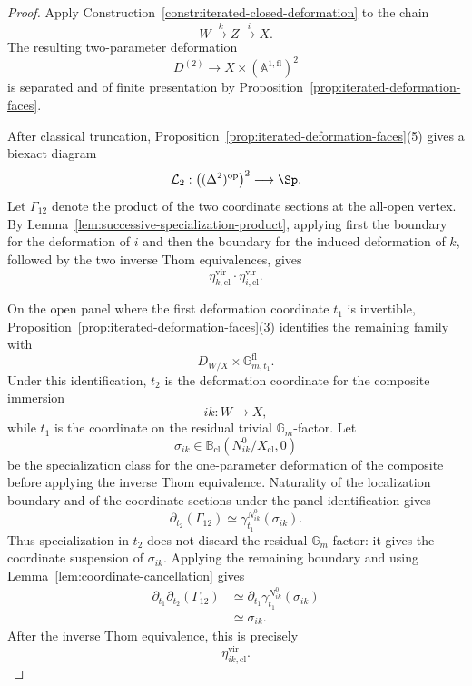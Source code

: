 \begin{proof}
Apply
Construction~\ref{constr:iterated-closed-deformation}
to the chain
\[
    W\xrightarrow{k}Z\xrightarrow{i}X.
\]
The resulting two-parameter deformation
\[
    D^{(2)}
    \longrightarrow
    X\times
    (\mathbb A^{1,\mathrm{fl}})^2
\]
is separated and of finite presentation by
Proposition~\ref{prop:iterated-deformation-faces}.

After classical truncation,
Proposition~\ref{prop:iterated-deformation-faces}(5)
gives a biexact diagram
\[
    \mathcal L_2:
    \bigl(
      (\Delta^2)^{\mathrm{op}}
    \bigr)^2
    \longrightarrow
    \Sp.
\]
Let \(\Gamma_{12}\) denote the product of the two coordinate sections at
the all-open vertex.  By
Lemma~\ref{lem:successive-specialization-product}, applying first the
boundary for the deformation of \(i\) and then the boundary for the induced
deformation of \(k\), followed by the two inverse Thom equivalences, gives
\[
    \eta^{\mathrm{vir}}_{k,\mathrm{cl}}
    \cdot
    \eta^{\mathrm{vir}}_{i,\mathrm{cl}}.
\]

On the open panel where the first deformation coordinate \(t_1\) is
invertible,
Proposition~\ref{prop:iterated-deformation-faces}(3)
identifies the remaining family with
\[
    D_{W/X}\times\mathbb G_{m,t_1}^{\mathrm{fl}}.
\]
Under this identification, \(t_2\) is the deformation coordinate for the
composite immersion
\[
    ik:W\longrightarrow X,
\]
while \(t_1\) is the coordinate on the residual trivial
\(\mathbb G_m\)-factor.  Let
\[
    \sigma_{ik}
    \in
    \mathbb B_{\mathrm{cl}}
    (N_{ik}^0/X_{\mathrm{cl}},0)
\]
be the specialization class for the one-parameter deformation of the
composite before applying the inverse Thom equivalence.  Naturality of the
localization boundary and of the coordinate sections under the panel
identification gives
\[
    \partial_{t_2}(\Gamma_{12})
    \simeq
    \gamma_{t_1}^{N_{ik}^0}(\sigma_{ik}).
\]
Thus specialization in \(t_2\) does not discard the residual
\(\mathbb G_m\)-factor: it gives the coordinate suspension of
\(\sigma_{ik}\).  Applying the remaining boundary and using
Lemma~\ref{lem:coordinate-cancellation} gives
\[
\begin{aligned}
    \partial_{t_1}\partial_{t_2}(\Gamma_{12})
    &\simeq
    \partial_{t_1}
    \gamma_{t_1}^{N_{ik}^0}(\sigma_{ik}) \\
    &\simeq
    \sigma_{ik}.
\end{aligned}
\]
After the inverse Thom equivalence, this is precisely
\[
    \eta^{\mathrm{vir}}_{ik,\mathrm{cl}}.
\]


\end{proof}
